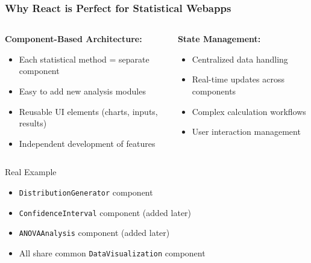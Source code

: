 \documentclass[aspectratio=169]{beamer}
\begin{document}
\begin{frame}
\frametitle{Why React is Perfect for Statistical Webapps}
\begin{columns}
\begin{column}{0.5\textwidth}
\textbf{Component-Based Architecture:}
\begin{itemize}
\item Each statistical method = separate component
\item Easy to add new analysis modules
\item Reusable UI elements (charts, inputs, results)
\item Independent development of features
\end{itemize}
\end{column}
\begin{column}{0.5\textwidth}
\textbf{State Management:}
\begin{itemize}
\item Centralized data handling
\item Real-time updates across components
\item Complex calculation workflows
\item User interaction management
\end{itemize}
\end{column}
\end{columns}

\begin{alertblock}{Real Example}
\begin{itemize}
\item \texttt{DistributionGenerator} component
\item \texttt{ConfidenceInterval} component (added later)
\item \texttt{ANOVAAnalysis} component (added later)
\item All share common \texttt{DataVisualization} component
\end{itemize}
\end{alertblock}
\end{frame}
\end{document}
